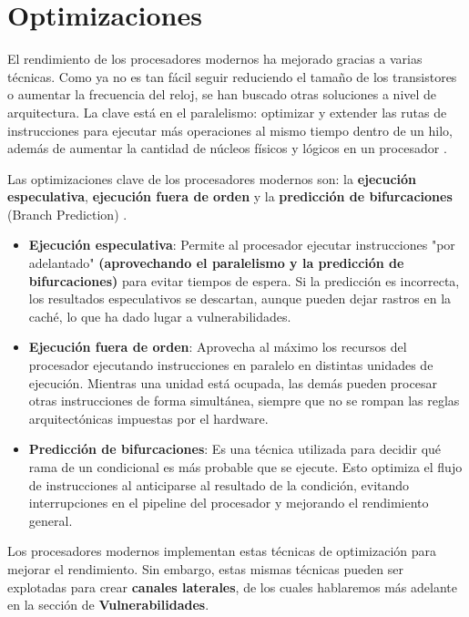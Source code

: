 \documentclass[lettersize,compsoc]{IEEEtran}
\begin{document}
\section{Optimizaciones}

El rendimiento de los procesadores modernos ha mejorado gracias a varias técnicas. Como ya no es tan fácil seguir reduciendo el tamaño de los transistores o aumentar la frecuencia del reloj, se han buscado otras soluciones a nivel de arquitectura. La clave está en el paralelismo\cite{paralelismo}: optimizar y extender las rutas de instrucciones para ejecutar más operaciones al mismo tiempo dentro de un hilo, además de aumentar la cantidad de núcleos físicos y lógicos en un procesador \cite{paralelismo}.

Las optimizaciones clave de los procesadores modernos son: la \textbf{ejecución especulativa}, \textbf{ejecución fuera de orden} y la \textbf{predicción de bifurcaciones} (Branch Prediction) \cite{ref}.  

\begin{itemize}
\item \textbf{Ejecución especulativa}: Permite al procesador ejecutar instrucciones "por adelantado" \textbf{(aprovechando el paralelismo y la predicción de bifurcaciones)} para evitar tiempos de espera. Si la predicción es incorrecta, los resultados especulativos se descartan, aunque pueden dejar rastros en la caché, lo que ha dado lugar a vulnerabilidades.
\item \textbf{Ejecución fuera de orden}: Aprovecha al máximo los recursos del procesador ejecutando instrucciones en paralelo en distintas unidades de ejecución. Mientras una unidad está ocupada, las demás pueden procesar otras instrucciones de forma simultánea, siempre que no se rompan las reglas arquitectónicas impuestas por el hardware.
\item \textbf{Predicción de bifurcaciones}: Es una técnica utilizada para decidir qué rama de un condicional es más probable que se ejecute. Esto optimiza el flujo de instrucciones al anticiparse al resultado de la condición, evitando interrupciones en el pipeline del procesador y mejorando el rendimiento general.
\end{itemize}


Los procesadores modernos implementan estas técnicas de optimización para mejorar el rendimiento. Sin embargo, estas mismas técnicas pueden ser explotadas para crear \textbf{canales laterales}, de los cuales hablaremos más adelante en la sección de \textbf{Vulnerabilidades}.
\end{document}
